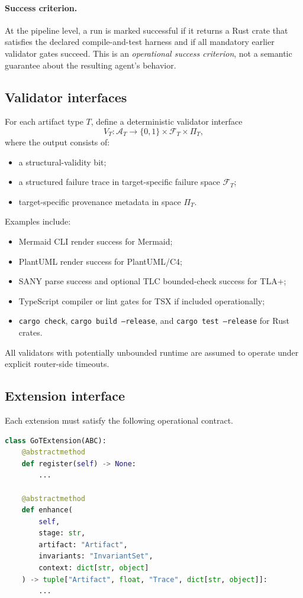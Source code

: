 \documentclass[11pt,a4paper,oneside]{article}
\begin{document}
\paragraph{Success criterion.}
At the pipeline level, a run is marked successful if it returns a Rust crate that satisfies the declared compile-and-test harness and if all mandatory earlier validator gates succeed. This is an \emph{operational success criterion}, not a semantic guarantee about the resulting agent's behavior.

\subsection{Validator interfaces}
For each artifact type $T$, define a deterministic validator interface
\[
V_T : \mathcal{A}_T \to \{0,1\} \times \mathcal{F}_T \times \Pi_T,
\]
where the output consists of:
\begin{itemize}[leftmargin=2em]
    \item a structural-validity bit;
    \item a structured failure trace in target-specific failure space $\mathcal{F}_T$;
    \item target-specific provenance metadata in space $\Pi_T$.
\end{itemize}
Examples include:
\begin{itemize}[leftmargin=2em]
    \item Mermaid CLI render success for Mermaid;
    \item PlantUML render success for PlantUML/C4;
    \item SANY parse success and optional TLC bounded-check success for TLA+;
    \item TypeScript compiler or lint gates for TSX if included operationally;
    \item \texttt{cargo check}, \texttt{cargo build --release}, and \texttt{cargo test --release} for Rust crates.
\end{itemize}
All validators with potentially unbounded runtime are assumed to operate under explicit router-side timeouts.

\subsection{Extension interface}
Each extension must satisfy the following operational contract.

\begin{lstlisting}[language=Python,caption={Operational extension interface.}]
class GoTExtension(ABC):
    @abstractmethod
    def register(self) -> None:
        ...

    @abstractmethod
    def enhance(
        self,
        stage: str,
        artifact: "Artifact",
        invariants: "InvariantSet",
        context: dict[str, object]
    ) -> tuple["Artifact", float, "Trace", dict[str, object]]:
        ...
\end{lstlisting}
\end{document}
